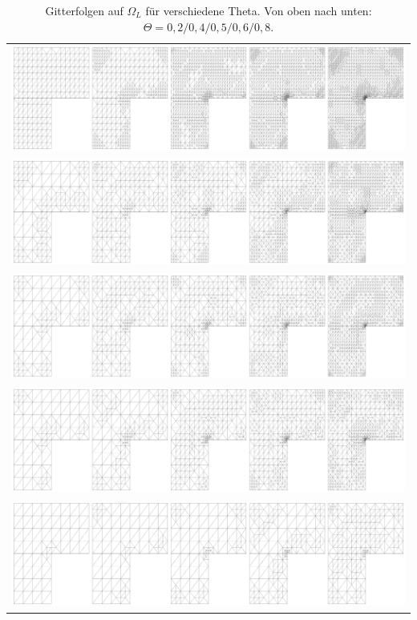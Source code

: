\begin{table}[!htbp]
	\begin{tabular}{c}
		\includegraphics[width=16.5cm,height=3.5cm]{pics/grid02.png} \\
		\includegraphics[width=16.5cm,height=3.5cm]{pics/grid04.png} \\
		\includegraphics[width=16.5cm,height=3.5cm]{pics/grid05.png} \\
		\includegraphics[width=16.5cm,height=3.5cm]{pics/grid06.png} \\
		\includegraphics[width=16.5cm,height=3.5cm]{pics/grid08.png} \\
	\end{tabular}
	\caption{ \label{tabelle} Gitterfolgen auf $\Omega_L$ für verschiedene Theta. Von oben nach unten: \newline $\Theta = 0,2/0,4/0,5/0,6/0,8$.}
\end{table}
